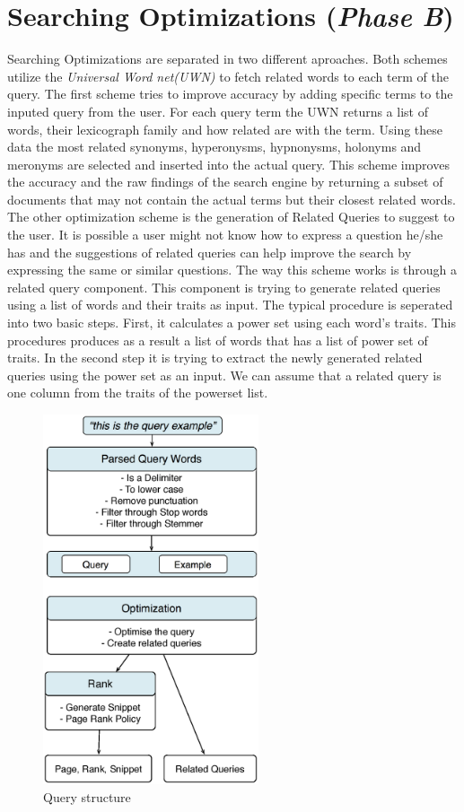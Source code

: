 \documentclass[letterpaper,twocolumn,10pt]{article}
\begin{document}
\section{Searching Optimizations (\emph{Phase B})}
Searching Optimizations are separated in two different aproaches. Both schemes utilize the \emph{Universal Word net(UWN)} to fetch related words to each term of the query. The first scheme tries to improve accuracy by adding specific terms to the inputed query from the user. For each query term the UWN returns a list of words, their lexicograph family and how related are with the term. Using these data the most related synonyms, hyperonysms, hypnonysms, holonyms and meronyms are selected and inserted into the actual query. This scheme improves the accuracy and the raw findings of the search engine by returning a subset of documents that may not contain the actual terms but their closest related words. The other optimization scheme is the generation of Related Queries to suggest to the user. It is possible a user might not know how to express a question he/she has and the suggestions of related queries can help improve the search by expressing the same or similar questions. The way this scheme works is through a related query component. This component is trying to generate related queries using a list of words and their traits as input. The typical procedure is seperated into two basic steps. First, it calculates a power set using each word's traits. This procedures produces as a result a list of words that has a list of power set of traits. In the second step it is trying to extract the newly generated related queries using the power set as an input. We can assume that a related query is one column from the traits of the powerset list.

\begin{figure}[H]
    \centering
    \includegraphics[width=2.5in]{Query.eps}
    \caption{Query structure}
    \label{Query structure}
\end{figure}
\end{document}
